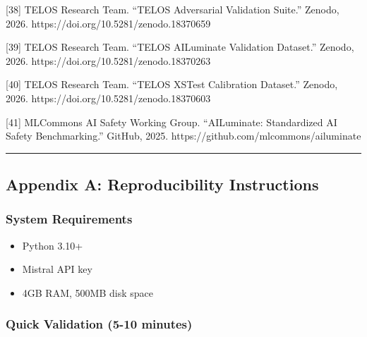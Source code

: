 {[}38{]} TELOS Research Team. ``TELOS Adversarial Validation Suite.''
Zenodo, 2026. https://doi.org/10.5281/zenodo.18370659

{[}39{]} TELOS Research Team. ``TELOS AILuminate Validation Dataset.''
Zenodo, 2026. https://doi.org/10.5281/zenodo.18370263

{[}40{]} TELOS Research Team. ``TELOS XSTest Calibration Dataset.''
Zenodo, 2026. https://doi.org/10.5281/zenodo.18370603

{[}41{]} MLCommons AI Safety Working Group. ``AILuminate: Standardized
AI Safety Benchmarking.'' GitHub, 2025.
https://github.com/mlcommons/ailuminate

\begin{center}\rule{0.5\linewidth}{0.5pt}\end{center}

\subsection{Appendix A: Reproducibility
Instructions}\label{appendix-a-reproducibility-instructions}

\subsubsection{System Requirements}\label{system-requirements}

\begin{itemize}
\tightlist
\item
  Python 3.10+
\item
  Mistral API key
\item
  4GB RAM, 500MB disk space
\end{itemize}

\subsubsection{Quick Validation (5-10
minutes)}\label{quick-validation-5-10-minutes}

\begin{Shaded}
\begin{Highlighting}[]
 \OperatorTok{=}
\end{Highlighting}
\end{Shaded}

